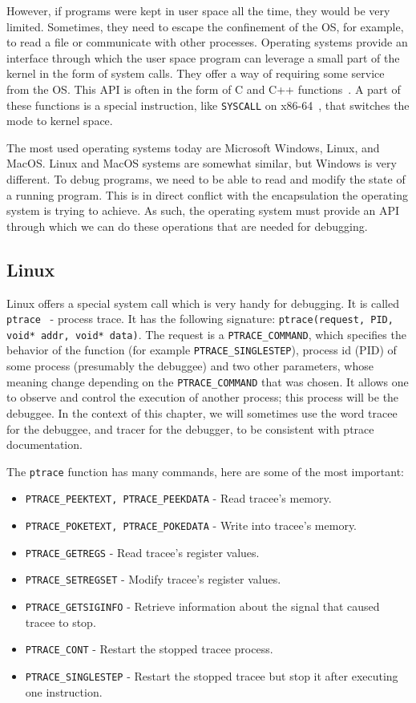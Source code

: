 However, if programs were kept in user space all the time, they would be very
limited. Sometimes, they need to escape the confinement of the OS, for example,
to read a file or communicate with other processes. Operating systems provide
an interface through which the user space program can leverage a small part of
the kernel in the form of system calls. They offer a way of requiring some
service from the OS. This API is often in the form of C and C++
functions~\cite{os-concepts}. A part of these functions is a special
instruction, like \texttt{SYSCALL} on x86-64~\cite{intel-manual}, that switches
the mode to kernel space.

The most used operating systems today are Microsoft Windows, Linux, and MacOS.
Linux and MacOS systems are somewhat similar, but Windows is very different. To
debug programs, we need to be able to read and modify the state of a running
program. This is in direct conflict with the encapsulation the operating system
is trying to achieve. As such, the operating system must provide an API through
which we can do these operations that are needed for debugging.

\subsection{Linux}\label{section:linux-dbg}
Linux offers a special system call which is very handy for debugging. It is
called \texttt{ptrace}~\cite{ptrace} - process trace. It has the following
signature: \texttt{ptrace(request, PID, void* addr, void* data)}. The request
is a \texttt{PTRACE\_COMMAND}, which specifies the behavior of the function
(for example \texttt{PTRACE\_SINGLESTEP}), process id (PID) of some process
(presumably the debuggee) and two other parameters, whose meaning change
depending on the \texttt{PTRACE\_COMMAND} that was chosen. It allows one to
observe and control the execution of another process; this process will be the
debuggee. In the context of this chapter, we will sometimes use the word tracee
for the debuggee, and tracer for the debugger, to be consistent with ptrace
documentation.

The \texttt{ptrace} function has many commands, here are some of the most important:
\begin{itemize}
    \item \texttt{PTRACE\_PEEKTEXT, PTRACE\_PEEKDATA} - Read tracee's memory.
    \item \texttt{PTRACE\_POKETEXT, PTRACE\_POKEDATA} - Write into tracee's
          memory.
    \item \texttt{PTRACE\_GETREGS} - Read tracee's register values.
    \item \texttt{PTRACE\_SETREGSET} - Modify tracee's register values.
    \item \texttt{PTRACE\_GETSIGINFO} - Retrieve information about the signal
                                        that caused tracee to stop.
    \item \texttt{PTRACE\_CONT} - Restart the stopped tracee process.
    \item \texttt{PTRACE\_SINGLESTEP} - Restart the stopped tracee but
          stop it after executing one instruction.
\end{itemize}

